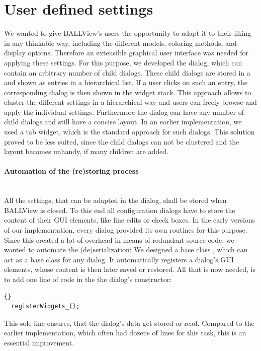 \section{User defined settings}
\label{preferences}
We wanted to give BALLView's users the opportunity to adapt it to their liking in any
thinkable way, including the different models, coloring methods, and display options. 
Therefore an extensible graphical user interface was needed for applying these settings. 
For this purpose, we developed the  dialog, which can contain an 
arbitrary number of child dialogs. 
These child dialogs are stored in a  and shown as entries in 
a hierarchical list. 
If a user clicks on such an entry, the corresponding dialog is then shown in the 
widget stack.
This approach allows to cluster the different settings in a hierarchical way
and users can freely browse and apply the individual settings.
Furthermore the  dialog can have any number of child dialogs and still 
have a concise layout.
In an earlier implementation, we used a tab widget, which is the standard approach for
such dialogs. This solution proved to be less suited, since the child dialogs can not
be clustered and the layout becomes unhandy, if many children are added.

\paragraph{Automation of the (re)storing process}
\hspace*{\fill}\\
All the settings, that can be adapted in the  dialog, shall be 
stored when BALLView is closed.
To this end all configuration dialogs have to store the content of their GUI elements,
like line edits or check boxes.
In the early versions of our implementation, every dialog provided its
own routines for this purpose.
Since this created a lot of overhead in means of redundant source code,
we wanted to automate the (de)serialization:
We designed a base class , which can act as a base class for any dialog.
It automatically registers a dialog's GUI elements, whose content is then later
saved or restored.
All that is now needed, is to add one line of code in the 
the dialog's constructor:
\begin{lstlisting}{}
  registerWidgets_();
\end{lstlisting}

This sole line ensures, that the dialog's data get stored or read.
Compared to the earlier implementation, which often had dozens of lines
for this task, this is an essential improvement.

